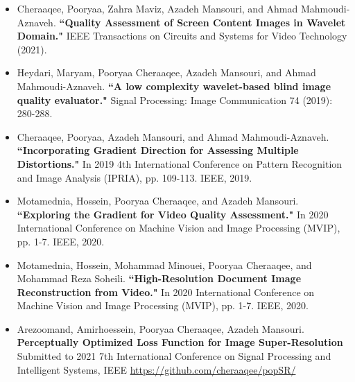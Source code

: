 \documentclass[10pt,a4paper]{altacv}
\begin{document}
\begin{itemize}
		\item Cheraaqee, Pooryaa, Zahra Maviz, Azadeh Mansouri, and Ahmad Mahmoudi-Aznaveh. \textbf{``Quality Assessment of Screen Content Images in Wavelet Domain."} IEEE Transactions on Circuits and Systems for Video Technology (2021).

		\item Heydari, Maryam, Pooryaa Cheraaqee, Azadeh Mansouri, and Ahmad Mahmoudi-Aznaveh. \textbf{``A low complexity wavelet-based blind image quality evaluator."} Signal Processing: Image Communication 74 (2019): 280-288.

		\item Cheraaqee, Pooryaa, Azadeh Mansouri, and Ahmad Mahmoudi-Aznaveh. \textbf{``Incorporating Gradient Direction for Assessing Multiple Distortions."} In 2019 4th International Conference on Pattern Recognition and Image Analysis (IPRIA), pp. 109-113. IEEE, 2019.

		\item Motamednia, Hossein, Pooryaa Cheraaqee, and Azadeh Mansouri. \textbf{``Exploring the Gradient for Video Quality Assessment."} In 2020 International Conference on Machine Vision and Image Processing (MVIP), pp. 1-7. IEEE, 2020.

		\item Motamednia, Hossein, Mohammad Minouei, Pooryaa Cheraaqee, and Mohammad Reza Soheili. \textbf{``High-Resolution Document Image Reconstruction from Video."} In 2020 International Conference on Machine Vision and Image Processing (MVIP), pp. 1-7. IEEE, 2020.
  
		\item Arezoomand, Amirhoessein, Pooryaa Cheraaqee, Azadeh Mansouri. \textbf{Perceptually Optimized Loss Function for Image Super-Resolution} Submitted to 2021 7th International Conference on Signal Processing and Intelligent Systems, IEEE \href{https://github.com/cheraaqee/popSR/}{https://github.com/cheraaqee/popSR/}
  \end{itemize}



\clearpage
\end{document}
